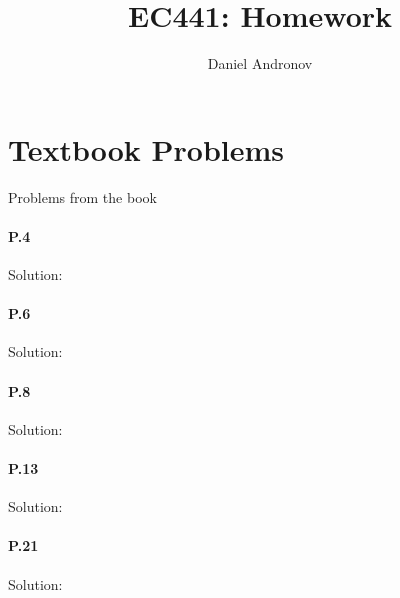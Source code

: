 \documentclass[12pt]{article}
\title{EC441: Homework \hwNum{}}
\author{Daniel Andronov}
\date{\displaydate{date}}
\begin{document}
\maketitle
\newpage

\section{Textbook Problems}
Problems from the book

\paragraph{P.4}                                                                                                                                          
Solution:                                                                                                                                                       
\paragraph{P.6}                                                                                                                                                      
Solution:                                                                                                                                                            
\paragraph{P.8}                                                                                                                                                      
Solution:                                                                                                                                                            
\paragraph{P.13}                                                                                                                                                     
Solution:                                                                                                                                                            
\paragraph{P.21}                                                                                                                                                     
Solution:                                                                                                                                                            
\end{document}
